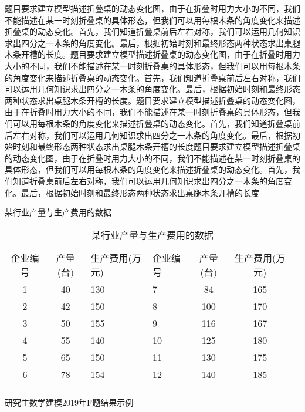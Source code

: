 \documentclass[bwprint]{gmcmthesis}
\begin{document}
题目要求建立模型描述折叠桌的动态变化图，由于在折叠时用力大小的不同，我们不能描述在某一时刻折叠桌的具体形态，但我们可以用每根木条的角度变化来描述折叠桌的动态变化。首先，我们知道折叠桌前后左右对称，我们可以运用几何知识求出四分之一木条的角度变化。最后，根据初始时刻和最终形态两种状态求出桌腿木条开槽的长度。题目要求建立模型描述折叠桌的动态变化图，由于在折叠时用力大小的不同，我们不能描述在某一时刻折叠桌的具体形态，但我们可以用每根木条的角度变化来描述折叠桌的动态变化。首先，我们知道折叠桌前后左右对称，我们可以运用几何知识求出四分之一木条的角度变化。最后，根据初始时刻和最终形态两种状态求出桌腿木条开槽的长度。题目要求建立模型描述折叠桌的动态变化图，由于在折叠时用力大小的不同，我们不能描述在某一时刻折叠桌的具体形态，但我们可以用每根木条的角度变化来描述折叠桌的动态变化。首先，我们知道折叠桌前后左右对称，我们可以运用几何知识求出四分之一木条的角度变化。最后，根据初始时刻和最终形态两种状态求出桌腿木条开槽的长度题目要求建立模型描述折叠桌的动态变化图，由于在折叠时用力大小的不同，我们不能描述在某一时刻折叠桌的具体形态，但我们可以用每根木条的角度变化来描述折叠桌的动态变化。首先，我们知道折叠桌前后左右对称，我们可以运用几何知识求出四分之一木条的角度变化。最后，根据初始时刻和最终形态两种状态求出桌腿木条开槽的长度

某行业产量与生产费用的数据
\begin{table}[htp!]
\centering
\caption{某行业产量与生产费用的数据}%
\begin{tabularx}{0.94\textwidth}{c|c|YZc|c|Y}
    \Xhline{0.9pt}
	企业编号&	产量(台)&生产费用(万元)&企业编号&产量(台)&生产费用(万元)\\
	1&	40&	130&7&	84&	165\\
	2&	42&	150&8&	100&	170\\
	3&	50&	155&9&	116&	167\\
	4&	55&	140&10&	125&	180\\
	5&	65&	150&11&	130&	175\\
	6&	78&	154&12&	140&	185\\
    \Xhline{0.72pt}
\end{tabularx}
\end{table}

研究生数学建模2019年F题结果示例
\end{document}
